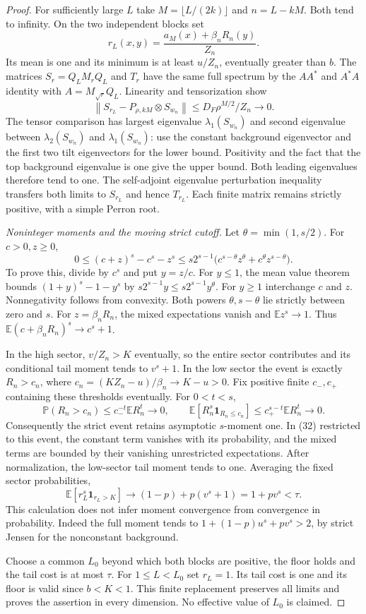 \begin{proof}
For sufficiently large $L$ take $M=\lfloor L/(2k)\rfloor$ and
$n=L-kM$. Both tend to infinity. On the two independent blocks set
\[
 r_L(x,y)=\frac{a_M(x)+\beta_nR_n(y)}{Z_n}.
\]
Its mean is one and its minimum is at least $u/Z_n$, eventually
greater than $b$. The matrices $S_r=Q_LM_rQ_L$ and $T_r$ have the
same full spectrum by the $AA^*$ and $A^*A$ identity with
$A=M_{\sqrt r}Q_L$. Linearity and tensorization show
\[
 \left\|S_{r_L}-P_{\rho,kM}\otimes S_{w_n}\right\|
 \le D_F\rho^{M/2}/Z_n\longrightarrow0.
\]
The tensor comparison has largest eigenvalue $\lambda_1(S_{w_n})$
and second eigenvalue between $\lambda_2(S_{w_n})$ and
$\lambda_1(S_{w_n})$: use the constant background eigenvector
and the first two tilt eigenvectors for the lower bound. Positivity
and the fact that the top background eigenvalue is one give the
upper bound. Both leading eigenvalues therefore tend to one.
The self-adjoint eigenvalue perturbation inequality transfers both
limits to $S_{r_L}$ and hence $T_{r_L}$. Each finite matrix remains
strictly positive, with a simple Perron root.

\emph{Noninteger moments and the moving strict cutoff.}
Let $\theta=\min(1,s/2)$. For $c>0,z\ge0$,
\[
 0\le(c+z)^s-c^s-z^s
 \le s2^{s-1}\big(c^{s-\theta}z^\theta+
                   c^\theta z^{s-\theta}\big).       \tag{32}
\]
To prove this, divide by $c^s$ and put $y=z/c$. For $y\le1$,
the mean value theorem bounds $(1+y)^s-1-y^s$ by
$s2^{s-1}y\le s2^{s-1}y^\theta$. For $y\ge1$ interchange
$c$ and $z$. Nonnegativity follows from convexity. Both powers
$\theta,s-\theta$ lie strictly between zero and $s$.
For $z=\beta_nR_n$, the mixed expectations vanish and
$\mathbb Ez^s\to1$. Thus $\mathbb E(c+\beta_nR_n)^s\to c^s+1$.

In the high sector, $v/Z_n>K$ eventually, so the entire sector
contributes and its conditional tail moment tends to $v^s+1$.
In the low sector the event is exactly $R_n>c_n$, where
$c_n=(KZ_n-u)/\beta_n\to K-u>0$. Fix positive finite
$c_-,c_+$ containing these thresholds eventually. For $0<t<s$,
\[
 \mathbb P(R_n>c_n)\le c_-^{-t}\mathbb ER_n^t\to0,
 \qquad
 \mathbb E[R_n^s\mathbf1_{R_n\le c_n}]
 \le c_+^{s-t}\mathbb ER_n^t\to0.
\]
Consequently the strict event retains asymptotic $s$-moment one.
In (32) restricted to this event, the constant term vanishes with
its probability, and the mixed terms are bounded by their vanishing
unrestricted expectations. After normalization, the low-sector
tail moment tends to one. Averaging the fixed sector probabilities,
\[
 \mathbb E[r_L^s\mathbf1_{r_L>K}]
 \longrightarrow (1-p)+p(v^s+1)=1+pv^s<\tau.
\]
This calculation does not infer moment convergence from convergence
in probability. Indeed the full moment tends to
$1+(1-p)u^s+pv^s>2$, by strict Jensen for the nonconstant background.

Choose a common $L_0$ beyond which both blocks are positive, the
floor holds and the tail cost is at most $\tau$. For $1\le L<L_0$
set $r_L=1$. Its tail cost is one and its floor is valid since
$b<K<1$. This finite replacement preserves all limits and proves
the assertion in every dimension. No effective value of $L_0$ is claimed.
\end{proof}


